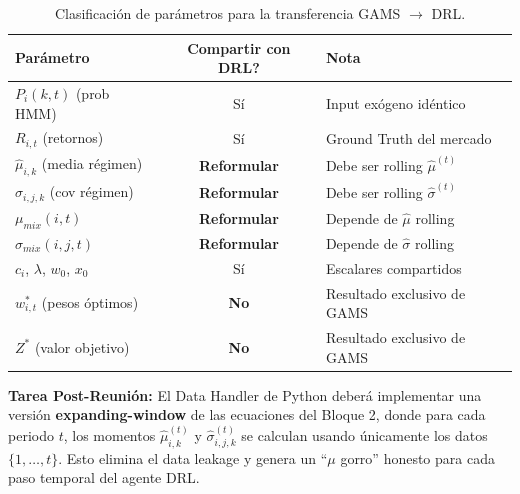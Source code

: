 \documentclass[11pt,a4paper]{article}
\begin{document}
\begin{table}[h!]
\centering
\renewcommand{\arraystretch}{1.4}
\begin{tabular}{|l|c|l|}
\hline
\textbf{Parámetro} & \textbf{Compartir con DRL?} & \textbf{Nota} \\
\hline
$P_i(k,t)$ (prob HMM) & Sí & Input exógeno idéntico \\
$R_{i,t}$ (retornos) & Sí & Ground Truth del mercado \\
$\hat{\mu}_{i,k}$ (media régimen) & \textbf{Reformular} & Debe ser rolling $\hat{\mu}^{(t)}$ \\
$\hat{\sigma}_{i,j,k}$ (cov régimen) & \textbf{Reformular} & Debe ser rolling $\hat{\sigma}^{(t)}$ \\
$\mu_{mix}(i,t)$ & \textbf{Reformular} & Depende de $\hat{\mu}$ rolling \\
$\sigma_{mix}(i,j,t)$ & \textbf{Reformular} & Depende de $\hat{\sigma}$ rolling \\
$c_i$, $\lambda$, $w_0$, $x_0$ & Sí & Escalares compartidos \\
$w^*_{i,t}$ (pesos óptimos) & \textbf{No} & Resultado exclusivo de GAMS \\
$Z^*$ (valor objetivo) & \textbf{No} & Resultado exclusivo de GAMS \\
\hline
\end{tabular}
\caption{Clasificación de parámetros para la transferencia GAMS $\rightarrow$ DRL.}
\end{table}

\vspace{5mm}
\colorbox{yellow!30}{\parbox{0.95\textwidth}{
\textbf{Tarea Post-Reunión:} El Data Handler de Python deberá implementar una versión \textbf{expanding-window} de las ecuaciones del Bloque 2, donde para cada periodo $t$, los momentos $\hat{\mu}^{(t)}_{i,k}$ y $\hat{\sigma}^{(t)}_{i,j,k}$ se calculan usando únicamente los datos $\{1, \ldots, t\}$. Esto elimina el data leakage y genera un ``$\mu$ gorro'' honesto para cada paso temporal del agente DRL.
}}
\end{document}
